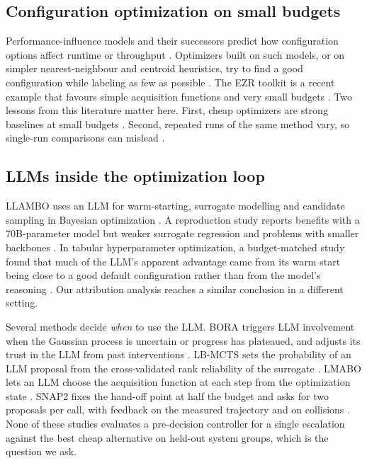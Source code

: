 \subsection{Configuration optimization on small budgets}

Performance-influence models and their successors predict how configuration options affect runtime or throughput \cite{siegmund2015influence,ha2019deepperf}. Optimizers built on such models, or on simpler nearest-neighbour and centroid heuristics, try to find a good configuration while labeling as few as possible \cite{nair2020flash,menzies2026ezr}. The EZR toolkit is a recent example that favours simple acquisition functions and very small budgets \cite{menzies2026ezr}. Two lessons from this literature matter here. First, cheap optimizers are strong baselines at small budgets \cite{ganguly2026tournament}. Second, repeated runs of the same method vary, so single-run comparisons can mislead \cite{rayegan2026instability}.

\subsection{LLMs inside the optimization loop}

LLAMBO uses an LLM for warm-starting, surrogate modelling and candidate sampling in Bayesian optimization \cite{liu2024llambo}. A reproduction study reports benefits with a 70B-parameter model but weaker surrogate regression and problems with smaller backbones \cite{rychert2025reproduction}. In tabular hyperparameter optimization, a budget-matched study found that much of the LLM's apparent advantage came from its warm start being close to a good default configuration rather than from the model's reasoning \cite{rodrigues2026worth}. Our attribution analysis reaches a similar conclusion in a different setting.

Several methods decide \emph{when} to use the LLM. BORA triggers LLM involvement when the Gaussian process is uncertain or progress has plateaued, and adjusts its trust in the LLM from past interventions \cite{cisse2025bora}. LB-MCTS sets the probability of an LLM proposal from the cross-validated rank reliability of the surrogate \cite{xu2026lbmcts}. LMABO lets an LLM choose the acquisition function at each step from the optimization state \cite{ngo2026lmabo}. SNAP2 fixes the hand-off point at half the budget and asks for two proposals per call, with feedback on the measured trajectory and on collisions \cite{srinivasan2026snap2}. None of these studies evaluates a pre-decision controller for a single escalation against the best cheap alternative on held-out system groups, which is the question we ask.

